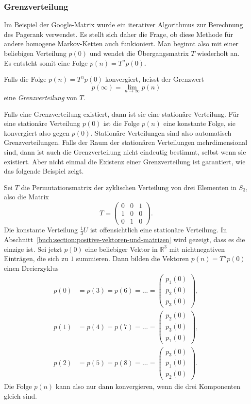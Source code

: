 \subsubsection{Grenzverteilung}
Im Beispiel der Google-Matrix wurde ein iterativer Algorithmus
zur Berechnung des Pagerank verwendet.
Es stellt sich daher die Frage, ob diese Methode für andere homogene
Markov-Ketten auch funkioniert.
Man beginnt also mit einer beliebigen Verteilung $p(0)$ und wendet
die Übergangsmatrix $T$ wiederholt an.
Es entsteht somit eine Folge $p(n) = T^np(0)$.

\begin{definition}
Falls die Folge $p(n) = T^np(0)$ konvergiert, heisst der Grenzwert
\[
p(\infty) = \lim_{n\to\infty} p(n)
\]
eine {\em Grenzverteilung} von $T$.
%
\end{definition}

Falls eine Grenzverteilung existiert, dann ist sie eine stationäre
Verteilung.
Für eine stationäre Verteilung $p(0)$ ist die Folge $p(n)$ eine
konstante Folge, sie konvergiert also gegen $p(0)$.
Stationäre Verteilungen sind also automatisch Grenzverteilungen.
Falls der Raum der stationären Verteilungen mehrdimensional sind,
dann ist auch die Grenzverteilung nicht eindeutig bestimmt, selbst
wenn sie existiert.
Aber nicht einmal die Existenz einer Grenzverteilung ist garantiert,
wie das folgende Beispiel zeigt.

\begin{beispiel}
Sei $T$ die Permutationsmatrix der zyklischen Verteilung von drei
Elementen in $S_3$, also die Matrix
\[
T=\begin{pmatrix}
0&0&1\\
1&0&0\\
0&1&0
\end{pmatrix}.
\]
Die konstante Verteilung $\frac13U$ ist offensichtlich eine
stationäre Verteilung.
In Abschnitt~\ref{buch:section:positive-vektoren-und-matrizen}
wird gezeigt, dass es die einzige ist.
Sei jetzt $p(0)$ eine beliebiger Vektor in $\mathbb{R}^3$ mit
nichtnegativen Einträgen, die sich zu $1$ summieren.
Dann bilden die Vektoren $p(n)=T^np(0)$ einen Dreierzyklus
\begin{align*}
p(0)&=p(3)=p(6)=\dots =\begin{pmatrix}p_1(0)\\p_2(0)\\p_3(0)\end{pmatrix},
\\
p(1)&=p(4)=p(7)=\dots =\begin{pmatrix}p_2(0)\\p_3(0)\\p_1(0)\end{pmatrix},
\\
p(2)&=p(5)=p(8)=\dots =\begin{pmatrix}p_3(0)\\p_1(0)\\p_2(0)\end{pmatrix}.
\end{align*}
Die Folge $p(n)$ kann also nur dann konvergieren, wenn die drei
Komponenten gleich sind.
\end{beispiel}

